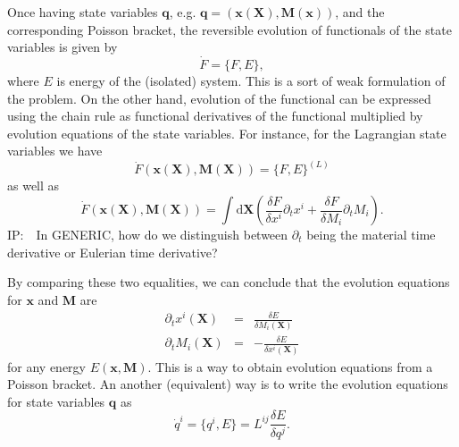 \documentclass[
10pt, %
a4paper, %
oneside, %
headinclude,footinclude, %
BCOR5mm, %
]{scrartcl}
\newcommand{\xx}{\mathbf{x}}
\newcommand{\XX}{\mathbf{X}}
\newcommand{\dX}{\mathrm{d}\XX}
\newcommand{\MM}{\mathbf{M}}
\newcommand{\qq}{\mathbf{q}}
\newcommand{\IP}[1]{{\color{Red}IP:\ \ #1}}
\newcommand{\pd}{\partial}
\begin{document}
Once having state variables $\qq$, e.g. $\qq=(\xx(\XX),\MM(\xx))$, and the corresponding Poisson bracket, the reversible evolution of functionals of the state variables is given by 
\begin{equation}
	\dot{F} = \{F,E\},
\end{equation}
where $E$ is energy of the (isolated) system. This is a sort of weak formulation of the problem. On the other hand, evolution of the functional can be expressed using the chain rule as functional derivatives of the functional multiplied by evolution equations of the state variables. For instance, for the Lagrangian state variables we have 
\begin{equation}
	\dot{F}(\xx(\XX),\MM(\XX)) = \{F,E\}^{(L)}
\end{equation}
as well as
\begin{equation}
	\dot{F}(\xx(\XX),\MM(\XX)) = \int\dX \left(\frac{\delta F}{\delta x^i} \partial_t x^i + \frac{\delta F}{\delta M_i} \partial_t M_i \right).
\end{equation}
\IP{In GENERIC, how do we distinguish between $ \pd_t $ being the material time derivative or 
Eulerian time 
derivative?}

By comparing these two equalities, we can conclude that the evolution equations for $\xx$ and $\MM$ are
\begin{subequations}\label{eq.L.evo}
	\begin{eqnarray}
		\partial_t x^i(\XX) &=& \frac{\delta E}{\delta M_i(\XX)}\\
		\partial_t M_i(\XX) &=& -\frac{\delta E}{\delta x^i(\XX)}
	\end{eqnarray}
\end{subequations}
	for any energy $E(\xx,\MM)$. 
This is a way to obtain evolution equations from a Poisson bracket. An another (equivalent) way is 
to write the evolution equations for state variables $\qq$ as
\begin{equation}\label{eq.qL}
	\dot{q}^i = \{q^i, E\} = L^{ij} \frac{\delta E}{\delta q^j}.
\end{equation}
\end{document}
